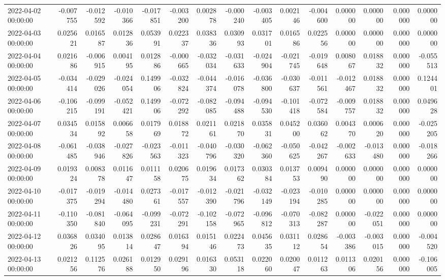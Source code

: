 \begin{tabular}{lrrrrrrrrrrrrrr}
2022-04-02 00:00:00 & -0.007755 & -0.012592 & -0.010366 & -0.017851 & -0.003200 & 0.002878 & -0.000240 & -0.003405 & 0.002146 & -0.004600 & 0.000000 & 0.000000 & 0.000000 & 0.000000 \\
2022-04-03 00:00:00 & 0.025621 & 0.016587 & 0.012836 & 0.053991 & 0.022337 & 0.038336 & 0.030993 & 0.031701 & 0.016586 & 0.022556 & 0.000000 & 0.000000 & 0.000000 & 0.000000 \\
2022-04-04 00:00:00 & 0.021686 & -0.006915 & 0.004195 & 0.012886 & -0.000665 & -0.032034 & -0.031633 & -0.024904 & -0.021745 & -0.019648 & 0.008067 & 0.018832 & 0.000000 & -0.055513 \\
2022-04-05 00:00:00 & -0.034414 & -0.029026 & -0.024054 & 0.149906 & -0.032824 & -0.044374 & -0.016078 & -0.036800 & -0.030637 & -0.011561 & -0.012467 & 0.018832 & 0.000000 & 0.124401 \\
2022-04-06 00:00:00 & -0.106215 & -0.099191 & -0.052421 & 0.149906 & -0.072292 & -0.082085 & -0.094488 & -0.094530 & -0.101418 & -0.072584 & -0.009757 & 0.018832 & 0.000000 & 0.049628 \\
2022-04-07 00:00:00 & 0.034534 & 0.015892 & 0.006658 & 0.017969 & 0.018872 & 0.021161 & 0.021870 & 0.035831 & 0.045200 & 0.036062 & 0.004370 & 0.000620 & 0.000000 & -0.025205 \\
2022-04-08 00:00:00 & -0.061485 & -0.038946 & -0.027826 & -0.023563 & -0.011323 & -0.040796 & -0.030320 & -0.062360 & -0.050625 & -0.042267 & -0.002633 & -0.013480 & 0.000000 & -0.018266 \\
2022-04-09 00:00:00 & 0.019324 & 0.008378 & 0.011647 & 0.011158 & 0.020675 & 0.019634 & 0.017362 & 0.030384 & 0.013753 & 0.009490 & 0.000000 & 0.000000 & 0.000000 & 0.000000 \\
2022-04-10 00:00:00 & -0.017375 & -0.019294 & -0.014480 & 0.027361 & -0.017557 & -0.012390 & -0.021796 & -0.032149 & -0.023194 & -0.010285 & 0.000000 & 0.000000 & 0.000000 & 0.000000 \\
2022-04-11 00:00:00 & -0.110350 & -0.081840 & -0.064095 & -0.099231 & -0.072291 & -0.102158 & -0.072965 & -0.096812 & -0.070313 & -0.082287 & 0.000000 & -0.022051 & 0.000000 & 0.000000 \\
2022-04-12 00:00:00 & 0.036826 & 0.034095 & 0.013814 & 0.028647 & 0.016394 & 0.015146 & 0.022473 & 0.045635 & 0.031112 & 0.028654 & -0.003386 & -0.003015 & 0.000000 & -0.004520 \\
2022-04-13 00:00:00 & 0.021256 & 0.112576 & 0.026188 & 0.012950 & 0.029196 & 0.016330 & 0.053118 & 0.022060 & 0.020047 & 0.011263 & 0.011306 & 0.020156 & 0.000000 & -0.106005 \\

\end{tabular}

